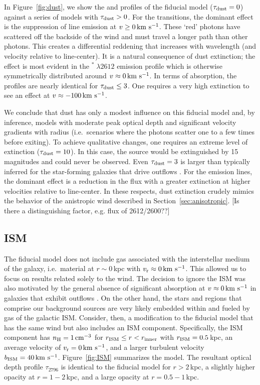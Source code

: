 \documentclass[12pt,preprint]{aastex}
\begin{document}
In Figure~\ref{fig:dust}, we show the  and 
profiles of the fiducial model ($\tau_{\rm dust} = 0$) against a series of
models with $\tau_{\rm dust} > 0$.  For the  transitions, the
dominant effect is the suppression of line emission at $v \ge 0
\, {\rm km~s^{-1}}$.  These `red' photons have scattered off the
backside of the wind and must travel a longer path than other
photons.  This creates a differential reddening that increases with wavelength (and
velocity relative to line-center). It is a natural consequence of dust
extinction;  the effect is most evident in the $^* \; \lambda 2612$
emission profile which is otherwise symmetrically distributed around
$v \approx 0 \, {\rm km~s^{-1}}$.   In terms of absorption, the profiles are
nearly identical for $\tau_{\rm dust} \le 3$.  One requires a very high
extinction to see an effect at $v \approx -100 \, {\rm km~s^{-1}}$.

We conclude that dust has only a modest influence on this fiducial model and,
by inference, models with moderate peak optical depth and
significant velocity gradients with radius (i.e.\ scenarios where the
photons scatter one to a few times before exiting).
To achieve qualitative changes, one requires an extreme level of
extinction ($\tau_{\rm dust} = 10$).  In this case, the source would be
extinguished by 15\,magnitudes and could never be observed. 
Even $\tau_{\rm dust} = 3$ is larger than typically inferred for the
star-forming galaxies that drive outflows \citep[e.g.][]{dust}.
For the emission lines,
the dominant effect is a reduction in the flux 
with a greater extinction at higher velocities relative to line-center.
In these respects, dust extinction crudely mimics the behavior of the anistropic
wind described in Section~\ref{sec:anisotropic}. [Is there a
distinguishing factor, e.g. flux of 2612/2600??]


\subsection{ISM}
\label{sec:ISM}

The fiducial model does not include gas associated with
the interstellar medium of the galaxy, i.e.\ material at $r \sim
0$\,kpc with $v_{\rm r} \approx 0 \, {\rm km~s^{-1}}$.  This allowed us to focus on
results related solely to the wind.  The decision to ignore the ISM
was also motivated by the general absence of significant absorption at
$v \approx 0 \, {\rm km~s^{-1}}$ in galaxies that exhibit outflows 
\citep[e.g.][]{wcp+09,steidel+10,rubin+10}.
On the other hand, the stars and  regions that comprise our
background sources are very likely embedded within and fueled by gas
of the galactic ISM.  
Consider, then, a modification to the fiducial model that has the
same wind but also includes an ISM component. 
Specifically, the ISM component has $n_{\rm H} = 1 \, {\rm cm^{-3}}$ for
$r_{\rm ISM} \le r < r_{\rm inner}$ with $r_{\rm ISM} = 0.5$\,kpc, 
an average velocity of $v_{\rm r} = 0 \, {\rm km~s^{-1}}$, and a larger turbulent velocity $b_{\rm ISM} = 40 \, {\rm km~s^{-1}}$.
Figure~\ref{fig:ISM} summarizes the model.
The resultant optical depth profile $\tau_{2796}$ is identical to the
fiducial model for $r > 2$\,kpc, a slightly higher opacity at
$r=1-2$\,kpc, and a large opacity at $r = 0.5-1$\,kpc.
\end{document}
